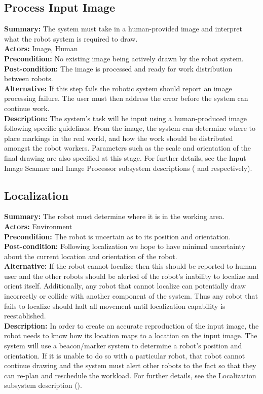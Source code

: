 \subsection{Process Input Image}
\textbf{Summary:} The system must take in a human-provided image and interpret what the robot system is required to draw. \\
\textbf{Actors:} Image, Human \\
\textbf{Precondition:}  No existing image being actively drawn by the robot system. \\
\textbf{Post-condition:} The image is processed and ready for work distribution between robots. \\
\textbf{Alternative:} If this step fails the robotic system should report an image processing failure. The user must then address the error before the system can continue work.\\
\textbf{Description:} The system's task will be input using a human-produced image following specific guidelines. From the image, the system can determine where to place markings in the real world, and how the work should be distributed amongst the robot workers. Parameters such as the scale and orientation of the final drawing are also specified at this stage. For further details, see the Input Image Scanner and Image Processor subsystem descriptions ( and  respectively).\\

\subsection{Localization}
\textbf{Summary:} The robot must determine where it is in the working area. \\
\textbf{Actors:} Environment \\
\textbf{Precondition:} The robot is uncertain as to its position and orientation. \\
\textbf{Post-condition:} Following localization we hope to have minimal uncertainty about the current location and orientation of the robot. \\
\textbf{Alternative:} If the robot cannot localize then this should be reported to human user and the other robots should be alerted of the robot's inability to localize and orient itself. Additionally, any robot that cannot localize can potentially draw incorrectly or collide with another component of the system. Thus any robot that fails to localize should halt all movement until localization capability is reestablished.\\
\textbf{Description:} In order to create an accurate reproduction of the input image, the robot needs to know how its location maps to a location on the input image. The system will use a beacon/marker system to determine a robot's position and orientation. If it is unable to do so with a particular robot, that robot cannot continue drawing and the system must alert other robots to the fact so that they can re-plan and reschedule the workload. For further details, see the Localization subsystem description ().\\

